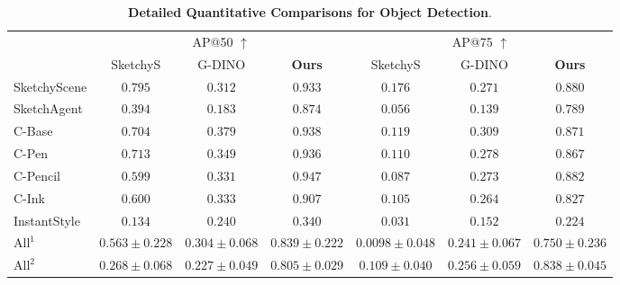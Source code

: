 \begin{table*}
\small
\setlength{\tabcolsep}{3pt}
\addtolength{\belowcaptionskip}{-5pt}
\centering
\caption{\textbf{Detailed Quantitative Comparisons for Object Detection}.} 
\label{tb:bbox}

\begin{tabular}{l | c c c | c c c } 
    \toprule
    &
     \multicolumn{3}{c|}{AP@50 $\uparrow$} & \multicolumn{3}{c}{AP@75 $\uparrow$} \\
    &  SketchyS & G-DINO & \textbf{Ours} & SketchyS & G-DINO & \textbf{Ours}  \\
    \midrule
    SketchyScene & $0.795$ & $0.312$ & $0.933$ & $0.176$ & $0.271$ & \textbf{$0.880$} \\
    SketchAgent & $0.394$ & $0.183$ & $0.874$ & $0.056$ & $0.139$ & $0.789$ \\
    C-Base & $0.704$ & $0.379$ & $0.938$ & $0.119$ & $0.309$ & $0.871$ \\
    C-Pen & $0.713$ & $0.349$ & $0.936$ & $0.110$ & $0.278$ & $0.867$ \\
    C-Pencil & $0.599$ & $0.331$ & $0.947$ & $0.087$ & $0.273$ & $0.882$ \\
    C-Ink  & $0.600$ & $0.333$ & $0.907$ & $0.105$ & $0.264$ & $0.827$ \\
    InstantStyle & $0.134$ & $0.240$ & $0.340$ & $0.031$ & $0.152$ & $0.224$ \\
    \midrule
    $\text{All}^1$ & $0.563 \pm 0.228$ & $0.304 \pm 0.068$ & $0.839 \pm 0.222$ & $0.0098 \pm 0.048$ & $0.241 \pm 0.067$ & $0.750 \pm 0.236$ \\
    $\text{All}^2$ & $0.268 \pm 0.068$ & $0.227 \pm 0.049$ & $0.805 \pm 0.029$ & $ 0.109 \pm 0.040$ & $0.256 \pm 0.059$ & $0.838 \pm 0.045$ \\
    \bottomrule
\end{tabular}
\end{table*}